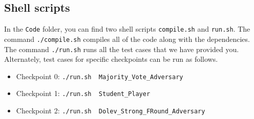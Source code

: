 \subsection{Shell scripts}
In the {\tt Code} folder, you can find two shell scripts
    {\tt compile.sh} and {\tt run.sh}.
The command {\tt ./compile.sh} compiles all of the code along with the dependencies.
The command {\tt ./run.sh} runs all the test cases that we have provided you.
Alternately, test cases for specific checkpoints can be run as follows.
\begin{itemize}
\item Checkpoint 0: {\tt ./run.sh \ Majority\_Vote\_Adversary}
\item Checkpoint 1: {\tt ./run.sh \ Student\_Player}
\item Checkpoint 2: {\tt ./run.sh \ Dolev\_Strong\_FRound\_Adversary}
\end{itemize}
%
